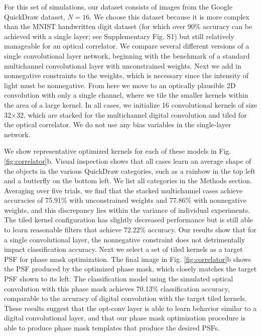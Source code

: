 \documentclass[fleqn,10pt]{wlscirep}
\begin{document}
For this set of simulations, our dataset consists of images from the Google QuickDraw dataset, $N = 16$. We choose this dataset because it is more complex than the MNIST handwritten digit dataset (for which over 90\% accuracy can be achieved with a single layer; see Supplementary Fig. S1) but still relatively manageable for an optical correlator. We compare several different versions of a single convolutional layer network, beginning with the benchmark of a standard multichannel convolutional layer with unconstrained weights. Next we add in nonnegative constraints to the weights, which is necessary since the intensity of light must be nonnegative. From here we move to an optically plausible 2D convolution with only a single channel, where we tile the smaller kernels within the area of a large kernel. In all cases, we initialize 16 convolutional kernels of size 32$\times$32, which are stacked for the multichannel digital convolution and tiled for the optical correlator. We do not use any bias variables in the single-layer network. 

We show representative optimized kernels for each of these models in Fig. \ref{fig:correlator}b. Visual inspection shows that all cases learn an average shape of the objects in the various QuickDraw categories, such as a rainbow in the top left and a butterfly on the bottom left. We list all categories in the Methods section. Averaging over five trials, we find that the stacked multichannel cases achieve accuracies of 75.91\% with unconstrained weights and 77.86\% with nonnegative weights, and this discrepancy lies within the variance of individual experiments. The tiled kernel configuration has slightly decreased performance but is still able to learn reasonable filters that achieve 72.22\% accuracy. Our results show that for a single convolutional layer, the nonnegative constraint does not detrimentally impact classification accuracy. Next we select a set of tiled kernels as a target PSF for phase mask optimization. The final image in Fig. \ref{fig:correlator}b shows the PSF produced by the optimized phase mask, which closely matches the target PSF shown to its left. The classification model using the simulated optical convolution with this phase mask achieves 70.13\% classification accuracy, comparable to the accuracy of digital convolution with the target tiled kernels. These results suggest that the opt-conv layer is able to learn behavior similar to a digital convolutional layer, and that our phase mask optimization procedure is able to produce phase mask templates that produce the desired PSFs. 
\end{document}
